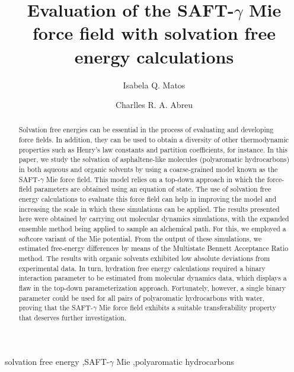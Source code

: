\documentclass[preprint]{elsarticle}
\begin{document}
	
	\begin{frontmatter}
		
		\title{Evaluation of the SAFT-$\gamma$ Mie force field with solvation free energy calculations}
		
		\author{Isabela Q. Matos}
		\author{Charlles R. A. Abreu }
		\address{Chemical Engineering Department, Escola de Qu\'{i}mica, Universidade Federal do Rio de Janeiro, Av. Athos da Silveira Ramos 149, Rio de Janeiro, RJ 21941-909, Brazil}
		
		
		\begin{abstract}
		Solvation free energies can be essential in the process of evaluating and developing force fields. In addition, they can be used to obtain a diversity of other thermodynamic properties such as Henry's law constants and partition coefficients, for instance. In this paper, we study the solvation of asphaltene-like molecules (polyaromatic hydrocarbons) in both aqueous and organic solvents by using a coarse-grained model known as the SAFT-$\gamma$ Mie force field. This model relies on a top-down approach in which the force-field parameters are obtained using an equation of state. The use of solvation free energy calculations to evaluate this force field can help in improving the model and increasing the scale in which these simulations can be applied. The results presented here were obtained by carrying out molecular dynamics simulations, with the expanded ensemble method being applied to sample an alchemical path. For this, we employed a softcore variant of the Mie potential. From the output of these simulations, we estimated free-energy differences by means of the Multistate Bennett Acceptance Ratio method. The results with organic solvents exhibited low absolute deviations from experimental data. In turn, hydration free energy calculations required a binary interaction parameter to be estimated from molecular dynamics data, which displays a flaw in the top-down parameterization approach. Fortunately, however, a single binary parameter could be used for all pairs of polyaromatic hydrocarbons with water, proving that the SAFT-$\gamma$ Mie force field exhibits a suitable transferability property that deserves further investigation.
		\end{abstract}
		
		
		
		\begin{keyword}
			solvation free energy \sep SAFT-$\gamma$ Mie \sep polyaromatic hydrocarbons
		\end{keyword}
		
	\end{frontmatter}
	
\end{document}
